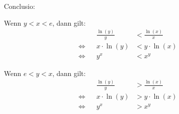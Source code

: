 \documentclass[
  11pt,
  a4paper,
  DIV=11,
  numbers=noendperiod]{scrartcl}
\begin{document}
Conclusio:

Wenn \(y<x<e\), dann gilt: \[
\begin{aligned}
&& \frac{\ln(y)}{y} & < \frac{\ln(x)}{x}\\
\Leftrightarrow && x\cdot \ln(y) & < y \cdot \ln(x)\\
\Leftrightarrow && y^x &< x^y
\end{aligned}
\]

Wenn \(e<y<x\), dann gilt: \[
\begin{aligned}
&& \frac{\ln(y)}{y} & > \frac{\ln(x)}{x}\\
\Leftrightarrow && x\cdot \ln(y) & > y \cdot \ln(x)\\
\Leftrightarrow && y^x &> x^y
\end{aligned}
\]
\end{document}
